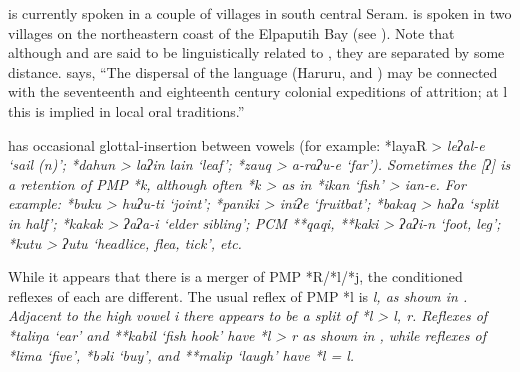  is currently spoken in a couple of villages in south central Seram.
 is spoken in two villages on the northeastern coast of
the Elpaputih Bay (see ).
Note that although 
and  are said to be linguistically related to ,
they are separated by some distance.
\citet[38]{Collins1983} says, “The dispersal of the  language
(Haruru,  and ) may be connected with the seventeenth
and eighteenth century colonial expeditions of attrition; at
l this is implied in local oral traditions.”

 has occasional glottal-insertion between vowels (for
example: \mbox{*layaR} > \it{leʔal-e} ‘sail (n)’; *dahun > \it{laʔin
{\tl} lain} ‘leaf’; *zauq > \it{a-raʔu-e} ‘far’).
Sometimes the [ʔ] is a retention of PMP *k,
although often *k > {\0} as in *ikan ‘fish’ > \it{ian-e}.
For example: *buku > \it{huʔu-ti} ‘joint’; *paniki > \it{iniʔe}
‘fruitbat’; *bakaq > \it{haʔa} ‘split in half’; *kakak > \it{ʔaʔa-i}
‘elder sibling’; PCM **qaqi,
**kaki > \it{ʔaʔi-n} ‘foot,
leg’; *kutu > \it{ʔutu} ‘headlice, flea, tick’, etc.

While it appears that there is a merger of PMP *R/*l/*j,
the conditioned reflexes of each are different.
The usual reflex of PMP *l is \it{l,} as shown in .
Adjacent to the high vowel \it{i} there appears to be a split
of *l > \it{l, r}.
Reflexes of *taliŋa ‘ear’
and **kabil ‘fish hook’ have *l > \it{r} as shown in ,
while reflexes of *lima ‘five’,
*bəli ‘buy’, and **malip ‘laugh’ have *l = \it{l}.
\\

